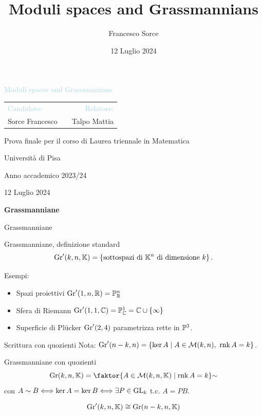 \documentclass[a4paper]{beamer}
\title{Moduli spaces and Grassmannians}
\author{Francesco Sorce}
\institute[]{Universit\`a di Pisa}
\date{12 Luglio 2024}
\begin{document}
\begin{frame}{}
\begin{center}
{\Large \textcolor{LightBlue}{Moduli spaces and Grassmannians}}
\vspace{1cm}

\begin{tabular}{lm{4.5cm}r}
\textcolor{LightBlue}{Candidato:} && \textcolor{LightBlue}{Relatore:}\\
Sorce Francesco && Talpo Mattia
\end{tabular}
\vspace{0.8cm}

{\footnotesize Prova finale per il corso di Laurea triennale in Matematica
\vspace{0.5cm}

Universit\`a di Pisa

Anno accademico 2023/24}
\medskip
\vspace{0.5cm}

12 Luglio 2024
\end{center}
\end{frame}

\begin{frame}{}
\begin{center}
{\huge \textbf{Grassmanniane}}
\end{center}
\end{frame}

\begin{frame}{Grassmanniane}
\begin{block}{Grassmanniane, definizione standard}
\[\mathrm{Gr}'(k,n,\mathbb{K})=\left\{{\text{sottospazi di $\mathbb{K}^n$ di dimensione $k$}}\right\}.\]
\end{block}
\bigskip

\pause
Esempi:
\begin{itemize}
\item Spazi proiettivi $\mathrm{Gr}'(1,n,\mathbb{R})=\mathbb{P}^n_{\mathbb{R}}$
\item Sfera di Riemann $\mathrm{Gr}'(1,1,\mathbb{C})=\mathbb{P}^1_{\mathbb{C}}=\mathbb{C}\cup \left\{{\infty}\right\}$
\end{itemize}
\pause
\begin{itemize}
\item Superficie di Pl\"ucker $\mathrm{Gr}'(2,4)$ parametrizza rette in $\mathbb{P}^3$.
\end{itemize}
\end{frame}

\begin{frame}{Scrittura con quozienti}
Nota: $\mathrm{Gr}'(n-k,n)=\left\{{\ker A\mid A\in \mathcal{M}(k,n),\ \mathrm{rnk}\, A=k}\right\}$.
\medskip

\begin{block}{Grassmanniane con quozienti}
\[\Gr(k,n,\K)=\quot{\cpa{A\in \Mc(k,n,\K)\mid \rnk A=k}}\sim\]
con $A\sim B\Longleftrightarrow \ker A=\ker B\Longleftrightarrow \exists P\in\mathrm{GL}_k$ t.c. $A=PB$.
\end{block}
\medskip
\[\mathrm{Gr}'(k,n,\mathbb{K})\cong\mathrm{Gr}(n-k,n,\mathbb{K})\]
\end{frame}
\end{document}

